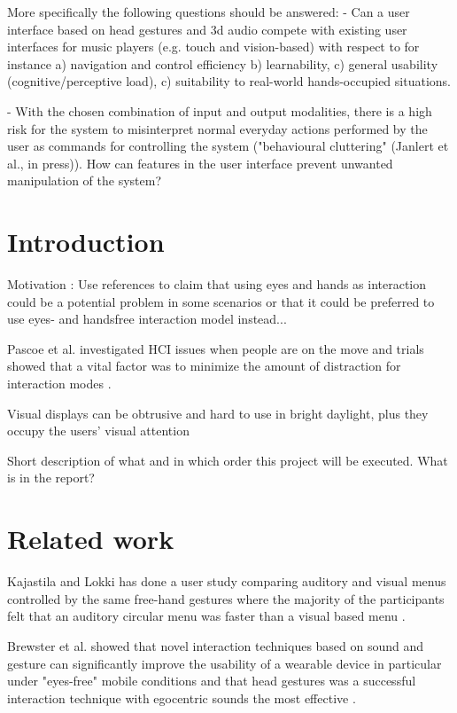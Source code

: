 \documentclass{article}
\begin{document}
More specifically the following questions should be answered: 
- Can a user interface based on head gestures and 3d audio compete with existing user interfaces for music players (e.g. touch and vision-based) with respect to for instance a) navigation and control efficiency b) learnability, c) general usability (cognitive/perceptive load), c) suitability to real-world hands-occupied situations. 

- With the chosen combination of input and output modalities, there is a high risk for the system to misinterpret normal everyday actions performed by the user as commands for controlling the system ("behavioural cluttering" (Janlert et al., in press)). How can features in the user interface prevent unwanted manipulation of the system?

\clearpage

\tableofcontents

\clearpage

\section{Introduction}
Motivation : Use references to claim that using eyes and hands as interaction could be a potential problem in some scenarios or that it could be preferred to use eyes- and handsfree interaction model instead...

Pascoe et al. investigated HCI issues when people are on the move and trials showed that a vital factor was to minimize the amount of distraction for interaction modes \cite{pascoe_using_2000}.

Visual displays can be obtrusive and hard to use in bright daylight, plus they occupy the users’ visual attention \cite{geelhoed_safety_2000}

Short description of what and in which order this project will be executed. What is in the report?


\section{Related work}
Kajastila and Lokki has done a user study comparing auditory and visual menus controlled by the same free-hand gestures where the majority of the participants felt that an auditory circular menu was faster than a visual based menu \cite{kajastila_interaction_2013}.

Brewster et al. showed that novel interaction techniques based on sound and gesture can significantly improve the usability of a wearable device in particular under "eyes-free" mobile conditions and that head gestures was a successful interaction technique with egocentric sounds the most effective \cite{brewster_multimodaleyes-freeinteraction_2003}.
\end{document}
